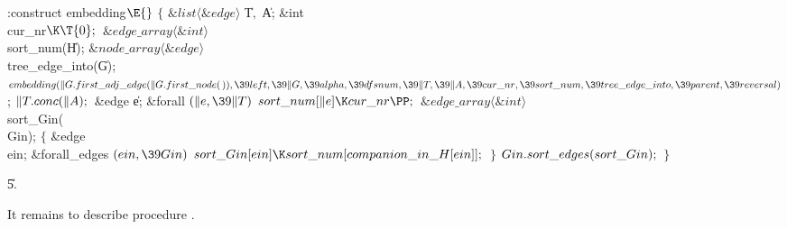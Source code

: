 \Y\B\4:construct embedding\X${}\E{}$\6
${}\{{}$\1\6
${}\&{list}\langle\&{edge}\rangle{}$ \|T${},{}$ \|A;\6
\&{int} \\{cur\_nr}${}\K\T{0};{}$\6
${}\&{edge\_array}\langle\&{int}\rangle{}$ \\{sort\_num}(\|H);\6
${}\&{node\_array}\langle\&{edge}\rangle{}$ \\{tree\_edge\_into}(\|G);\7
${}\\{embedding}(\|G.\\{first\_adj\_edge}(\|G.\\{first\_node}(\,)),\39\\{left},%
\39\|G,\39\\{alpha},\39\\{dfsnum},\39\|T,\39\|A,\39\\{cur\_nr},\39\\{sort%
\_num},\39\\{tree\_edge\_into},\39\\{parent},\39\\{reversal}){}$;\6
${}\|T.\\{conc}(\|A);{}$\7
\&{edge} \|e;\7
\&{forall} ${}(\|e,\39\|T){}$\1\5
${}\\{sort\_num}[\|e]\K\\{cur\_nr}\PP;{}$\2\7
${}\&{edge\_array}\langle\&{int}\rangle{}$ \\{sort\_Gin}(\\{Gin});\7
${}\{{}$\1\6
\&{edge} \\{ein};\7
\&{forall\_edges} ${}(\\{ein},\39\\{Gin}){}$\1\5
${}\\{sort\_Gin}[\\{ein}]\K\\{sort\_num}[\\{companion\_in\_H}[\\{ein}]];{}$\2\6
\4${}\}{}$\2\6
${}\\{Gin}.\\{sort\_edges}(\\{sort\_Gin});{}$\6
\4${}\}{}$\2\par
\U5.\fi

It remains to describe procedure .


